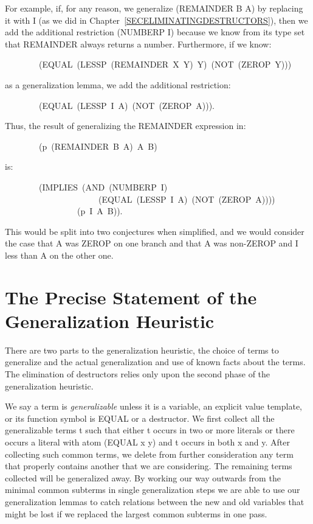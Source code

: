 \documentclass[11pt]{book}
\newenvironment{pubasis}{\begin{flushleft}\ttfamily\small}{\normalsize\rmfamily\end{flushleft}}
\newcommand{\pubinlineunderline}[1]{\emph{#1}}
\newcommand{\pubdefaulttextsize}{\large}
\begin{document}
For example,
if, for any reason, we generalize (REMAINDER B A)  by replacing it with I
(as we did in Chapter~\ref{SECELIMINATINGDESTRUCTORS}), then we
add the additional restriction (NUMBERP I) because we know from its type set
that
REMAINDER always returns a number.  Furthermore, if we
know:
\begin{pubasis}
~~~~~~~~(EQUAL~(LESSP~(REMAINDER~X~Y)~Y)~(NOT~(ZEROP~Y)))\\
\end{pubasis}
as a generalization lemma, we add the additional restriction:
\begin{pubasis}
~~~~~~~~(EQUAL~(LESSP~I~A)~(NOT~(ZEROP~A))).\\
\end{pubasis}
Thus, the result of generalizing the REMAINDER expression in:
\begin{pubasis}
~~~~~~~~(p~(REMAINDER~B~A)~A~B)\\
\end{pubasis}
is:
\begin{pubasis}
~~~~~~~~(IMPLIES~(AND~(NUMBERP~I)\\
~~~~~~~~~~~~~~~~~~~~~~(EQUAL~(LESSP~I~A)~(NOT~(ZEROP~A))))\\
~~~~~~~~~~~~~~~~~(p~I~A~B)).\\
\end{pubasis}
This would be split into two conjectures when simplified,
and we would consider the case that A was ZEROP on one branch
and that A was non-ZEROP and I less than A on the other one.
\section{The Precise Statement of the Generalization Heuristic}
\pubdefaulttextsize
There are
two parts to the generalization heuristic, the choice of terms to generalize and  the actual
generalization and use of known facts about the terms.  The elimination of
destructors  relies only upon the second phase of the generalization heuristic.

We say a term is \pubinlineunderline{generalizable} unless it is a variable,
an explicit value template, or its function symbol
is EQUAL or a destructor.
We first collect all the generalizable terms t such that either
t occurs in two or more literals or there occurs
a literal with atom (EQUAL x y) and t occurs in both x and y.
After collecting such common terms, we delete from further
consideration any term that properly contains another that
we are considering.  The remaining terms collected
will be generalized away.
By working our way outwards from the minimal 
common subterms in single generalization steps we are
able to use our generalization lemmas to catch relations between the new
and old variables that might be lost if we replaced the largest
common subterms in one pass.
\end{document}
